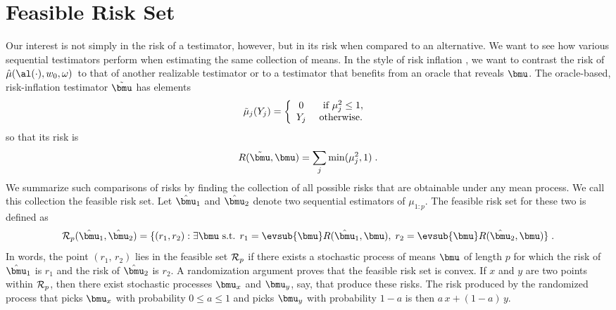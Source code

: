\documentclass[12pt]{article}
\newcommand{\test}{\mbox{$\hat\mu(\al(\cdot),w_0,\omega)$}}
\begin{document}
\section{ Feasible Risk Set }


 Our interest is not simply in the risk of a testimator, however, but in its
 risk when compared to an alternative.  We want to see how various sequential
 testimators perform when estimating the same collection of means.  In the style
 of risk inflation , we want to contrast the risk of \test\ to that
 of another realizable testimator or to a testimator that benefits from an
 oracle that reveals $\bmu$.  The oracle-based, risk-inflation testimator
 $\tilde{\bmu}$ has elements
 \begin{equation}
   \tilde\mu_j(Y_j) = \left\{ \begin{array}{cc} 
                       0    & \mbox{ if } \mu_j^2 \le 1,        \cr
                       Y_j  & \mbox{ otherwise. }
                \end{array} \right.
 \label{eq:muTilde}
 \end{equation}
 so that its risk is 
 \begin{equation}
    R(\tilde{\bmu},\bmu) = \sum_j \min(\mu_j^2,1) \;.   
 \label{eq:riskMuTilde}
 \end{equation}
 We summarize such comparisons of risks by finding the collection of all
 possible risks that are obtainable under any mean process.  We call this
 collection the feasible risk set.  Let $\hat{\bmu}_1$ and $\hat{\bmu}_2$ denote
 two sequential estimators of $\mu_{1:p}$.  The feasible risk set for these two
 is defined as
 \begin{equation}
     {\cal R}_p(\hat{\bmu}_1,\hat{\bmu}_2) = 
      \{(r_1,r_2):  \exists \bmu \mbox{  s.t.  }
          r_1 = \evsub{\bmu} R(\hat{\bmu}_1,\bmu),\;
          r_2 = \evsub{\bmu} R(\hat{\bmu}_2,\bmu)  \} \;.           
 \label{eq:feasibleSet}
 \end{equation}
 In words, the point $(r_1,\,r_2)$ lies in the feasible set ${\cal R}_p$ if
 there exists a stochastic process of means $\bmu$ of length $p$ for which the
 risk of $\hat{\bmu}_1$ is $r_1$ and the risk of $\hat{\bmu}_2$ is $r_2$.  A
 randomization argument proves that the feasible risk set is convex.  If $x$ and
 $y$ are two points within ${\cal R}_p$, then there exist stochastic processes
 $\bmu_x$ and $\bmu_y$, say, that produce these risks.  The risk produced by the
 randomized process that picks $\bmu_x$ with probability $0 \le a \le 1$ and
 picks $\bmu_y$ with probability $1-a$ is then $a\,x+(1-a)\,y$.
\end{document}
